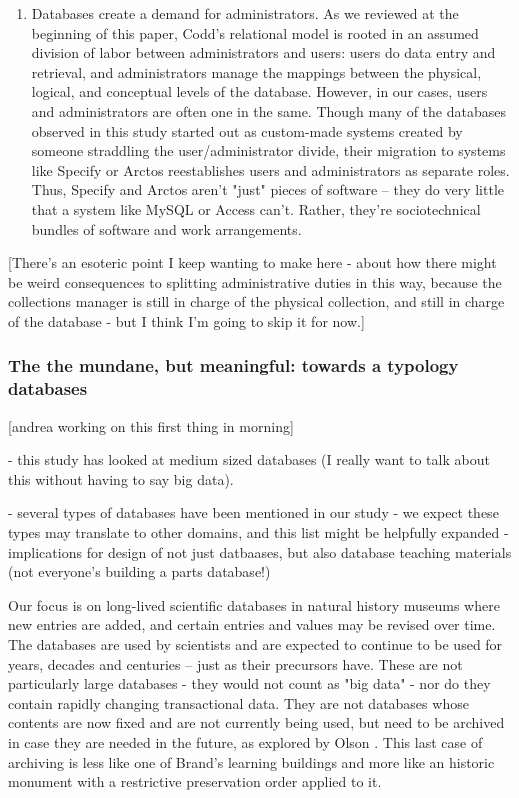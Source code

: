 \begin{enumerate}
\item Databases create a demand for administrators. As we reviewed at the beginning of this paper, Codd’s relational model is rooted in an assumed division of labor between administrators and users: users do data entry and retrieval, and administrators manage the mappings between the physical, logical, and conceptual levels of the database. However, in our cases, users and administrators are often one in the same. Though many of the databases observed in this study started out as custom-made systems created by someone straddling the user/administrator divide, their migration to systems like Specify or Arctos reestablishes users and administrators as separate roles. Thus, Specify and Arctos aren't "just" pieces of software -- they do very little that a system like MySQL or Access can't. Rather, they're sociotechnical bundles of software and work arrangements.
\end{enumerate}

[There's an esoteric point I keep wanting to make here - about how there might be weird consequences to splitting administrative duties in this way, because the collections manager is still in charge of the physical collection, and still in charge of the database - but I think I'm going to skip it for now.]

\subsubsection{The the mundane, but meaningful: towards a typology databases}

[andrea working on this first thing in morning]

- this study has looked at medium sized databases (I really want to talk about this without having to say big data).

- several types of databases have been mentioned in our study
- we expect these types may translate to other domains, and this list might be helpfully expanded
- implications for design of not just datbaases, but also database teaching materials (not everyone's building a parts database!)

Our focus is on long-lived scientific databases in natural history museums where new entries are added, and certain entries and values may be revised over time. The databases are used by scientists and are expected to continue to be used for years, decades and centuries – just as their precursors have. These are not particularly large databases - they would not count as "big data" - nor do they contain rapidly changing transactional data. They are not databases whose contents are now fixed and are not currently being used, but need to be archived in case they are  needed in the future, as explored by Olson \cite{olson2010database}. This last case of archiving is less like one of Brand’s learning buildings and more like an historic monument with a restrictive preservation order applied to it.

